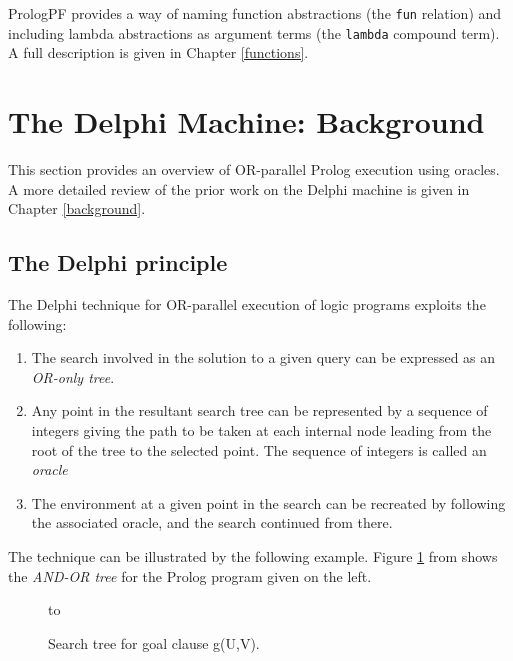 PrologPF provides a way of naming function abstractions (the \texttt{fun}
relation) and including lambda abstractions as argument terms (the 
\texttt{lambda} compound term).  A full
description is given in Chapter \ref{functions}.

\section{The Delphi Machine: Background} %
\label{delphi_background}
\enlargethispage{2\baselineskip} %

This section provides an overview of OR-parallel Prolog execution
using oracles.  A more detailed review of the prior work on the
Delphi machine is given in Chapter \ref{background}.

\subsection{The Delphi principle}

The Delphi technique for OR-parallel execution of logic programs
exploits the following:
\begin{enumerate}
\item{The search involved in the solution to a given query can
  be expressed as an \textit{OR-only tree}.}
\item{Any point in the resultant search tree can be represented by
  a sequence of integers giving the path to be taken at each internal
  node leading from the root of the tree to the selected point.
  The sequence of integers is called an \textit{oracle}}
\item{The environment at a given point in the search can be
  recreated by following the associated oracle, and the search continued
  from there.}
\end{enumerate}

The technique can be illustrated by the following example.
Figure \ref{and_or_tree} from \cite{CA87} shows the \textit{AND-OR tree} for
the Prolog program given on the left.


\begin{figure}[h]
\vspace{5mm} \hbox to 
\caption{Search tree for goal clause g(U,V).}
\vspace{5mm}
\label{and_or_tree}
\end{figure}

